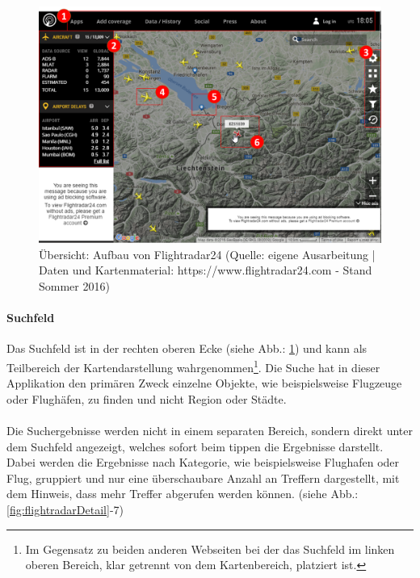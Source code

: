 \documentclass[../Bachelorarbeit.tex]{subfiles}
\begin{document}
\begin{figure}[H]
\centering
\includegraphics[width=1\linewidth]{img/StandDerTechnik/flightradarOverview}
\caption[Übersicht: Aufbau von Flightradar24]{Übersicht: Aufbau von Flightradar24 (Quelle: eigene Ausarbeitung | Daten und Kartenmaterial: https://www.flightradar24.com - Stand Sommer 2016)}
\label{fig:flightradarOverview}
\end{figure}

\paragraph{Suchfeld}
Das Suchfeld ist in der rechten oberen Ecke (siehe Abb.: \ref{fig:flightradarOverview}) und kann als Teilbereich der Kartendarstellung wahrgenommen\footnote{Im Gegensatz zu beiden anderen Webseiten bei der das Suchfeld im linken oberen Bereich, klar getrennt von dem Kartenbereich, platziert ist.}. 
Die Suche hat in dieser Applikation den primären Zweck einzelne Objekte, wie beispielsweise Flugzeuge oder Flughäfen, zu finden und nicht Region oder Städte.\\
\\
Die Suchergebnisse werden nicht in einem separaten Bereich, sondern direkt unter dem Suchfeld angezeigt, welches sofort beim tippen die Ergebnisse darstellt.  
Dabei werden die Ergebnisse nach Kategorie, wie beispielsweise Flughafen oder Flug, gruppiert und nur eine überschaubare Anzahl an Treffern dargestellt, mit dem Hinweis, dass mehr Treffer abgerufen werden können.
(siehe Abb.: \ref{fig:flightradarDetail}-7)
\end{document}
